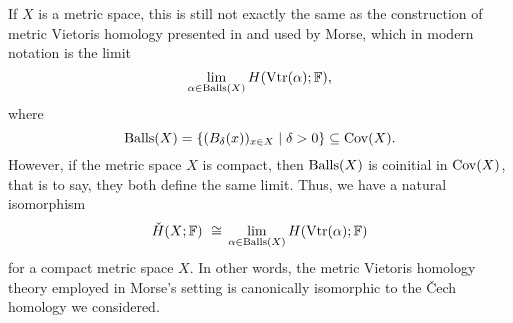 If $X$ is a metric space, this is still not exactly the same as the construction of metric Vietoris homology presented in \cite{MR1512371} and used by Morse, which in modern notation is the limit
\begin{equation*}
\lim_{\alpha \in \operatorname{Balls}(X)} H (\operatorname{Vtr} (\alpha); \mathbb{F}),
\end{equation*}
where 
\begin{equation*}
\operatorname{Balls} (X) = \left\{ ( B_{\delta} (x) )_{x \in X} \mid \delta > 0 \right\}
\subseteq \operatorname{Cov} (X).
\end{equation*}
However, if the metric space $X$ is compact, then $\operatorname{Balls} (X)$ is coinitial in $\operatorname{Cov} (X)$, that is to say, they both define the same limit.
Thus, we have a natural isomorphism
\begin{equation*}
\check{H} (X; \mathbb{F}) \ \cong \,
\lim_{\alpha \in \operatorname{Balls}(X)} H (\operatorname{Vtr} (\alpha); \mathbb{F})
\end{equation*}
for a compact metric space $X$.
In other words, the metric Vietoris homology theory employed in Morse's setting is canonically isomorphic to the \v{C}ech homology we considered.

